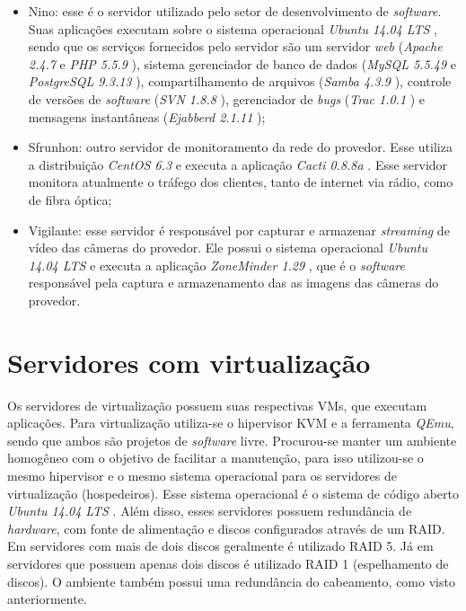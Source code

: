\begin{itemize}
 \item Nino: esse é o servidor utilizado pelo setor de desenvolvimento de \textit{software}. Suas aplicações executam sobre o sistema operacional 
 \textit{Ubuntu 14.04 \ac{LTS}} \cite{ubuntu}, sendo que os serviços fornecidos pelo servidor são um servidor \textit{web} (\textit{Apache 2.4.7} 
 \cite{apache} e \textit{\ac{PHP} 5.5.9} \cite{php}), sistema gerenciador de banco de dados (\textit{MySQL 5.5.49} \cite{mysql} e 
 \textit{PostgreSQL 9.3.13} \cite{postgres}), compartilhamento de arquivos (\textit{Samba 4.3.9} \cite{samba}), controle de versões de 
 \textit{software} (\textit{\ac{SVN} 1.8.8} \cite{svn}), gerenciador de \textit{bugs} (\textit{Trac 1.0.1} \cite{trac}) e mensagens instantâneas 
 (\textit{Ejabberd 2.1.11} \cite{ejabberd});
 
 \item Sfrunhon: outro servidor de monitoramento da rede do provedor. Esse utiliza a distribuição \textit{CentOS 6.3} \cite{centos} e executa a 
 aplicação \textit{Cacti 0.8.8a} \cite{cacti}. Esse servidor monitora atualmente o tráfego dos clientes, tanto de internet via rádio, como de 
 fibra óptica;
 
 \item Vigilante: esse servidor é responsável por capturar e armazenar \textit{streaming} de vídeo das câmeras do provedor. Ele possui o sistema 
 operacional \textit{Ubuntu 14.04 \ac{LTS}} \cite{ubuntu} e executa a aplicação \textit{ZoneMinder 1.29} \cite{zoneminder}, que é o 
 \textit{software} responsável pela captura e armazenamento das as imagens das câmeras do provedor.
\end{itemize}

\section{Servidores com virtualização}
\label{section:servvirt}

Os servidores de virtualização possuem suas respectivas \ac{VM}s, que executam aplicações. Para virtualização utiliza-se o hipervisor 
\ac{KVM} e a ferramenta \textit{QEmu}, sendo que ambos são projetos de \textit{software} livre. Procurou-se manter um ambiente homogêneo 
com o objetivo de facilitar a manutenção, para isso utilizou-se o mesmo hipervisor e o mesmo sistema operacional para os servidores de virtualização
(hospedeiros). 
Esse sistema operacional é o sistema de código aberto \textit{Ubuntu 14.04 \ac{LTS}} \cite{ubuntu}.
Além disso, esses servidores possuem redundância de \textit{hardware}, com fonte de alimentação e discos configurados através de um \ac{RAID}. 
Em servidores com mais de dois discos geralmente é utilizado \ac{RAID} 5. Já em servidores que possuem apenas dois discos é utilizado \ac{RAID} 1 
(espelhamento de discos). O ambiente também possui uma redundância do cabeamento, como visto anteriormente.

